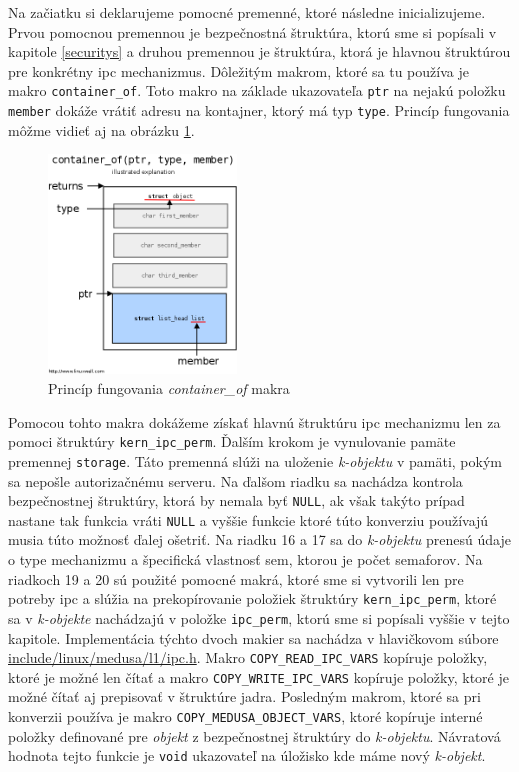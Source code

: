 Na začiatku si deklarujeme pomocné premenné, ktoré následne inicializujeme. Prvou pomocnou premennou je bezpečnostná štruktúra, ktorú sme si popísali v kapitole \ref{securitys} a druhou premennou je štruktúra, ktorá je hlavnou štruktúrou pre konkrétny \acrshort{ipc} mechanizmus. Dôležitým makrom, ktoré sa tu používa je makro \texttt{container\_of}. Toto makro na základe ukazovateľa \texttt{ptr} na nejakú položku \texttt{member} dokáže vrátiť adresu na kontajner, ktorý má typ \texttt{type}. Princíp fungovania môžme vidieť aj na obrázku \ref{containerof}.
\begin{figure}[!htbp]
  \centering
  \includegraphics[width=5cm]{img/container_of.png}
  \caption{Princíp fungovania \textit{container\_of} makra \cite{containerof}}
  \label{containerof}
\end{figure}
Pomocou tohto makra dokážeme získať hlavnú štruktúru \acrshort{ipc} mechanizmu len za pomoci štruktúry \texttt{kern\_ipc\_perm}. Ďalším krokom je vynulovanie pamäte premennej \texttt{storage}. Táto premenná slúži na uloženie \textit{k-objektu} v pamäti, pokým sa nepošle autorizačnému serveru. Na ďalšom riadku sa nachádza kontrola bezpečnostnej štruktúry, ktorá by nemala byť \texttt{NULL}, ak však takýto prípad nastane tak funkcia vráti \texttt{NULL} a vyššie funkcie ktoré túto konverziu používajú musia túto možnosť ďalej ošetriť. Na riadku 16 a 17 sa do \textit{k-objektu} prenesú údaje o type mechanizmu a špecifická vlastnosť \acrshort{sem}, ktorou je počet semaforov. Na riadkoch 19 a 20 sú použité pomocné makrá, ktoré sme si vytvorili len pre potreby \acrshort{ipc} a slúžia na prekopírovanie položiek štruktúry \texttt{kern\_ipc\_perm}, ktoré sa v \textit{k-objekte} nachádzajú v položke \texttt{ipc\_perm}, ktorú sme si popísali vyššie v tejto kapitole. Implementácia týchto dvoch makier sa nachádza v hlavičkovom súbore \url{include/linux/medusa/l1/ipc.h}. Makro \texttt{COPY\_READ\_IPC\_VARS} kopíruje položky, ktoré je možné len čítať a makro \texttt{COPY\_WRITE\_IPC\_VARS} kopíruje položky, ktoré je možné čítať aj prepisovať v štruktúre jadra. Posledným makrom, ktoré sa pri konverzii používa je makro \texttt{COPY\_MEDUSA\_OBJECT\_VARS}, ktoré kopíruje interné položky definované pre \textit{objekt} z bezpečnostnej štruktúry do \textit{k-objektu}. Návratová hodnota tejto funkcie je \texttt{void} ukazovateľ na úložisko kde máme nový \textit{k-objekt}.

